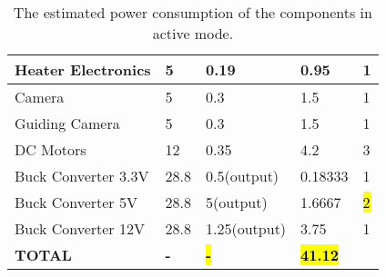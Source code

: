 \begin{center}
\begin{table}[H]
\begin{tabular}{|m{}|m{}|m{}|m{}|m{}|}
Heater Electronics      & 5                               & 0.19                                & 0.95                         & 1                 \\ \hline
Camera                  & 5                               & 0.3                                 & 1.5                          & 1                 \\ \hline
Guiding Camera          & 5                               & 0.3                                 & 1.5                          & 1                 \\ \hline
DC Motors               & 12                              & 0.35                                & 4.2                          & 3                 \\ \hline
Buck Converter 3.3V     & 28.8                            & 0.5(output)                         & 0.18333                      & 1                 \\ \hline
Buck Converter 5V       & 28.8                            & 5(output)                           & 1.6667                       &  \hl{2}                 \\ \hline
Buck Converter 12V      & 28.8                            & 1.25(output)                        & 3.75                         & 1                 \\ \hline
\textbf{TOTAL}          & \textbf{-}                      & \textbf{\hl{-}}                   & \textbf{\hl{41.12}}           &                   \\ \hline
\end{tabular}
\caption{The estimated power consumption of the components in active mode.}
\end{table}
\label{tab: power consumption}
\end{center}




\raggedbottom